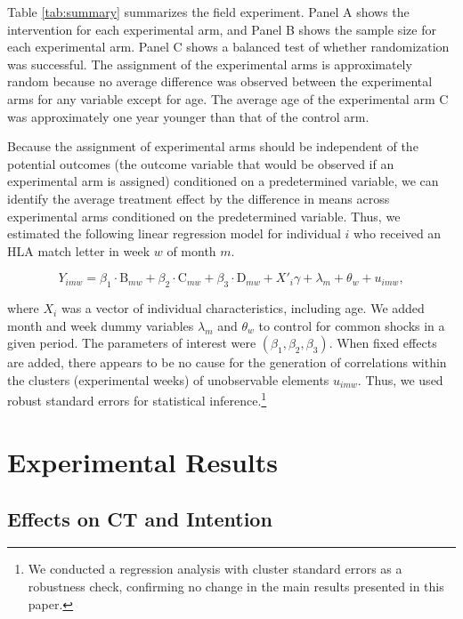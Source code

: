 \documentclass [12pt, a4paper]{article}
\begin{document}
Table \ref{tab:summary} summarizes the field experiment. Panel A shows the intervention for each experimental arm, and Panel B shows the sample size for each experimental arm. Panel C shows a balanced test of whether randomization was successful. The assignment of the experimental arms is approximately random because no average difference was observed between the experimental arms for any variable except for age. The average age of the experimental arm C was approximately one year younger than that of the control arm.

Because the assignment of experimental arms should be independent of the potential outcomes (the outcome variable that would be observed if an experimental arm is assigned) conditioned on a predetermined variable, we can identify the average treatment effect by the difference in means across experimental arms conditioned on the predetermined variable. Thus, we estimated the following linear regression model for individual \(i\) who received an HLA match letter in week \(w\) of month \(m\).

\begin{equation}
  Y_{imw} =
  \beta_1 \cdot \text{B}_{mw} + \beta_2 \cdot \text{C}_{mw} + \beta_3 \cdot \text{D}_{mw}
  + X'_i \gamma + \lambda_m + \theta_w + u_{imw}, \label{eq:reg}
\end{equation}

\noindent
where \(X_i\) was a vector of individual characteristics, including age. We added month and week dummy variables \(\lambda_m\) and \(\theta_w\) to control for common shocks in a given period. The parameters of interest were \((\beta_1, \beta_2, \beta_3)\). When fixed effects are added, there appears to be no cause for the generation of correlations within the clusters (experimental weeks) of unobservable elements \(u_{imw}\). Thus, we used robust standard errors for statistical inference.\footnote{We conducted a regression analysis with cluster standard errors as a robustness check, confirming no change in the main results presented in this paper.}

\hypertarget{result}{%
\section{Experimental Results}\label{result}}

\hypertarget{main}{%
\subsection{Effects on CT and Intention}\label{main}}
\end{document}
